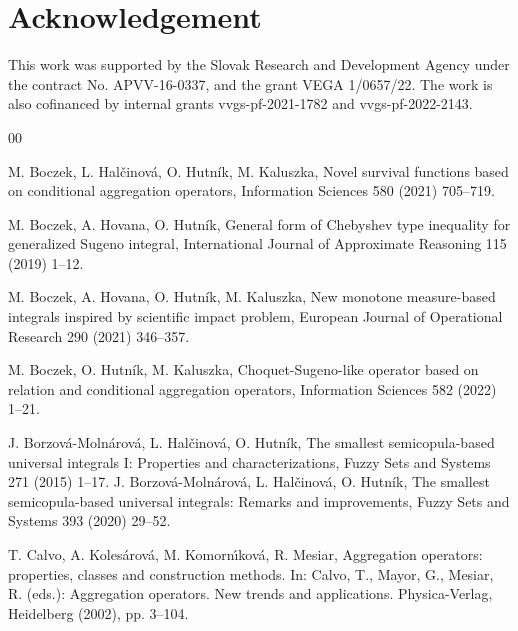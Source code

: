 \documentclass[preprint,11pt]{elsarticle}
\theoremstyle{definition}
\begin{document}
\section*{Acknowledgement}
This work was supported by the Slovak Research and Development Agency under the contract
No. APVV-16-0337, and the grant VEGA 1/0657/22. The work is also cofinanced by internal grants vvgs-pf-2021-1782 and vvgs-pf-2022-2143. %

\begin{thebibliography}{00}


 M. Boczek, L. Hal\v{c}inov\'a, O. Hutn\'ik, M. Kaluszka, Novel survival functions based on conditional aggregation operators,  Information Sciences 580 (2021) 705--719.

 M. Boczek, A. Hovana, O. Hutn\'ik, General form of Chebyshev type inequality for generalized Sugeno integral, International Journal of Approximate Reasoning 115 (2019) 1--12.


 M. Boczek, A. Hovana, O. Hutn\'ik, M. Kaluszka, New monotone measure-based integrals inspired by scientific impact problem, European Journal of Operational Research 290 (2021) 346--357.


 M. Boczek,  O. Hutn\'ik, M. Kaluszka, Choquet-Sugeno-like operator based on relation and conditional aggregation operators,  Information Sciences 582 (2022) 1--21. %



 J. Borzov\'{a}-Moln\'{a}rov\'{a}, L. Hal\v{c}inov\'{a}, O. Hutn\'{i}k, The smallest semicopula-based universal integrals I: Properties and characterizations, Fuzzy Sets and Systems 271 (2015) 1--17.
 J. Borzov\'{a}-Moln\'{a}rov\'{a}, L. Hal\v{c}inov\'{a}, O. Hutn\'{i}k, The smallest semicopula-based universal integrals: Remarks and
improvements, Fuzzy Sets and Systems 393 (2020) 29--52.

 T. Calvo, A. Kolesárová, M. Komorn\'{\i}ková, R. Mesiar, Aggregation operators: properties, classes and construction methods. In: Calvo, T., Mayor, G., Mesiar, R. (eds.): Aggregation operators. New trends and applications. Physica-Verlag, Heidelberg (2002), pp. 3--104.




\end{thebibliography}
\end{document}
